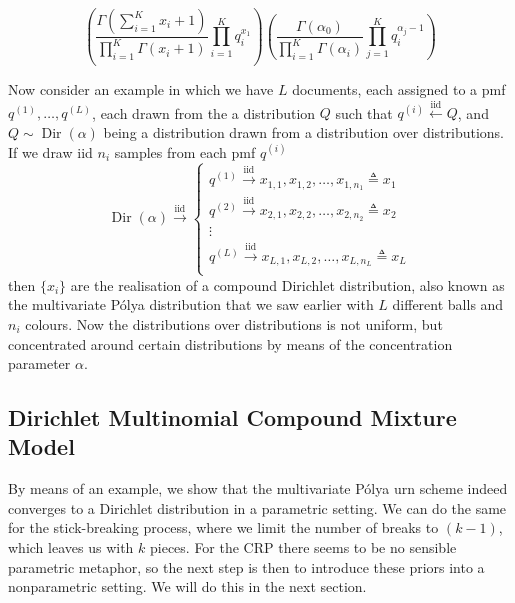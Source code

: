 \begin{equation}
	\left(\frac{\Gamma(\sum_{i=1}^K x_i+1)}{\prod_{i=1}^K \Gamma(x_i+1)}\prod_{i=1}^K q_i^{x_1}\right)\left(\frac{\Gamma(\alpha_0)}{\prod_{i=1}^K \Gamma(\alpha_i)} \prod_{j=1}^K q_i^{\alpha_j-1}\right)
\end{equation}

Now consider an example in which we have $L$ documents, each assigned to a pmf $q^{(1)}, \ldots, q^{(L)}$, each drawn from the a distribution $Q$ such that $q^{(i)} \overset{\text{iid}}{\leftarrow} Q$, and $Q\sim\operatorname{Dir}(\alpha)$ being a distribution drawn from a distribution over distributions. If we draw iid $n_i$ samples from each pmf $q^{(i)}$
\begin{equation}
	\operatorname{Dir}(\alpha) \overset{\text{iid}}{\rightarrow}
    \begin{cases}
    q^{(1)} \overset{\text{iid}}{\rightarrow} x_{1,1}, x_{1,2},\ldots,x_{1,n_1} \triangleq x_1\\
    q^{(2)} \overset{\text{iid}}{\rightarrow} x_{2,1}, x_{2,2},\ldots,x_{2,n_2} \triangleq x_2 \\
    \vdots \\
    q^{(L)} \overset{\text{iid}}{\rightarrow} x_{L,1}, x_{L,2},\ldots,x_{L,n_L} \triangleq x_L \\
  \end{cases}
\end{equation}
then $\{x_i\}$ are the realisation of a compound Dirichlet distribution, also known as the multivariate P\'olya distribution that we saw earlier with $L$ different balls and $n_i$ colours. Now the distributions over distributions is not uniform, but concentrated around certain distributions by means of the concentration parameter $\alpha$.

\subsection{Dirichlet Multinomial Compound Mixture Model}

By means of an example, we show that the multivariate P\'olya urn scheme indeed converges to a Dirichlet distribution in a parametric setting. We can do the same for the stick-breaking process, where we limit the number of breaks to $(k-1)$, which leaves us with $k$ pieces. For the CRP there seems to be no sensible parametric metaphor, so the next step is then to introduce these priors into a nonparametric setting. We will do this in the next section.

